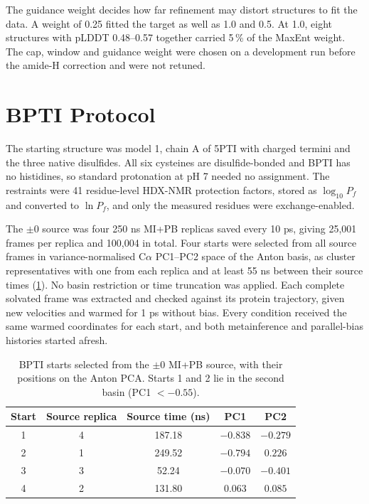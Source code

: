 The guidance weight decides how far refinement may distort structures to fit the data. A weight of 0.25 fitted the target as well as 1.0 and 0.5. At 1.0, eight structures with pLDDT 0.48--0.57 together carried 5\,\% of the MaxEnt weight. The cap, window and guidance weight were chosen on a development run before the amide-H correction and were not retuned.

\section{BPTI Protocol}
\label{app:biofeat-bpti}

The starting structure was model 1, chain A of 5PTI with charged termini and the three native disulfides. All six cysteines are disulfide-bonded and BPTI has no histidines, so standard protonation at pH 7 needed no assignment. The restraints were 41 residue-level HDX-NMR protection factors, stored as $\log_{10}P_f$ and converted to $\ln P_f$, and only the measured residues were exchange-enabled.

The $\pm0$ source was four 250 ns MI+PB replicas saved every 10 ps, giving 25,001 frames per replica and 100,004 in total. Four starts were selected from all source frames in variance-normalised C$\alpha$ PC1--PC2 space of the Anton basis, as cluster representatives with one from each replica and at least 55 ns between their source times (\cref{tab:biofeat-bpti-starts}). No basin restriction or time truncation was applied. Each complete solvated frame was extracted and checked against its protein trajectory, given new velocities and warmed for 1 ps without bias. Every condition received the same warmed coordinates for each start, and both metainference and parallel-bias histories started afresh.

\begin{table}[htbp]
    \centering
    \small
    \begin{tabular}{@{}ccccc@{}}
    \toprule
        \textbf{Start} & \textbf{Source replica} & \textbf{Source time (ns)} & \textbf{PC1} & \textbf{PC2} \\
    \midrule
        1 & 4 & 187.18 & $-0.838$ & $-0.279$ \\
        2 & 1 & 249.52 & $-0.794$ & $0.226$ \\
        3 & 3 & 52.24 & $-0.070$ & $-0.401$ \\
        4 & 2 & 131.80 & $0.063$ & $0.085$ \\
    \bottomrule
    \end{tabular}
    \caption{BPTI starts selected from the $\pm0$ MI+PB source, with their positions on the Anton PCA. Starts 1 and 2 lie in the second basin (PC1 $<-0.55$).}
    \label{tab:biofeat-bpti-starts}
\end{table}

